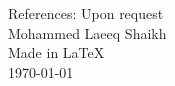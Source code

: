 
        References: Upon request\\
        {}
        Mohammed Laeeq Shaikh\\
        {}
        {}
        Made in \LaTeX\\
        \today
        \pagebreak